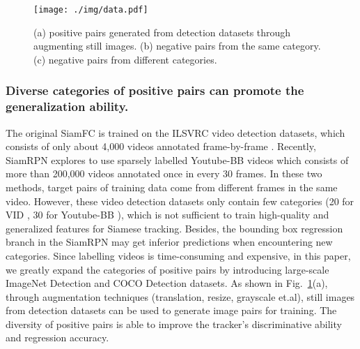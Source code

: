 \documentclass[runningheads]{llncs}
\begin{document}
\begin{figure}[t]
\setlength{\abovecaptionskip}{-0.2cm}
\setlength{\belowcaptionskip}{-0.5cm}
\begin{center}
\texttt{[image: ./img/data.pdf]}
\end{center}
\caption{(a) positive pairs generated from detection datasets through augmenting still images. (b) negative pairs from the same category. (c) negative pairs from different categories.}
\label{fig:data}
\end{figure}


\subsubsection{Diverse categories of positive pairs can promote the generalization ability.}
The original SiamFC is trained on the ILSVRC video detection datasets, which consists of only about 4,000 videos annotated frame-by-frame \cite{ILSVRC15}. Recently, SiamRPN \cite{SiamRPN} explores to use sparsely labelled Youtube-BB \cite{YouTubeBB} videos which consists of more than 200,000 videos annotated once in every 30 frames. In these two methods, target pairs of training data come from different frames in the same video. However, these video detection datasets only contain few categories (20 for VID \cite{ILSVRC15}, 30 for Youtube-BB \cite{YouTubeBB}), which is not sufficient to train high-quality and generalized features for Siamese tracking.
Besides, the bounding box regression branch in the SiamRPN may get inferior predictions when encountering new categories.
Since labelling videos is time-consuming and expensive, in this paper, we greatly expand the categories of positive pairs by introducing large-scale ImageNet Detection \cite{ILSVRC15} and COCO Detection \cite{COCO} datasets. As shown in Fig.~\ref{fig:data}(a), through augmentation techniques (translation, resize, grayscale et.al), still images from detection datasets can be used to generate image pairs for training.
The diversity of positive pairs is able to improve the tracker's discriminative ability and regression accuracy.
\end{document}
